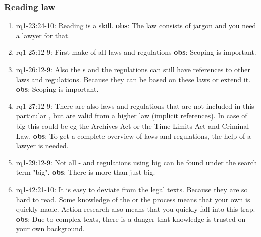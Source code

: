 \subsubsection{Reading law}
\begin{comment}
Hoort dit niet bij rq3?
plaats hier de afgehandelde items.
\end{comment}
\begin{enumerate}
    \item rq1-23:24-10:  Reading is a skill.
    \newline\textbf{obs}: The law consists of jargon and you need a lawyer for that.
    
    \item rq1-25:12-9: First make  of all laws and regulations
    \newline\textbf{obs}: Scoping is important.
    
    \item rq1-26:12-9: Also the s and the regulations can still have {references} to other laws and regulations.
    Because they can be based on these laws or extend it.
    \newline\textbf{obs}: Scoping is important.
    
    \item rq1-27:12-9: There are also laws and regulations that are not included in this particular , but are valid from a higher law (implicit references).
    In case of \acrshort{big} this could be eg the Archives Act or the Time Limits Act and Criminal Law.
    \newline\textbf{obs}: To get a complete overview of laws and regulations, the help of a lawyer is needed.
    
    
    \item rq1-29:12-9: Not all - and regulations using \acrshort{big} can be found under the search term "big".
    \newline\textbf{obs}: There is more than just \acrshort{big}.
    
    \item rq1-42:21-10: It is easy to deviate from the legal texts.
    Because they are so hard to read.
    Some knowledge of the  or the process means that your own  is quickly made.
    Action research also means that you quickly fall into this trap.
    \newline\textbf{obs}: Due to complex texts, there is a danger that knowledge is trusted on your own background.
    

\end{enumerate}
